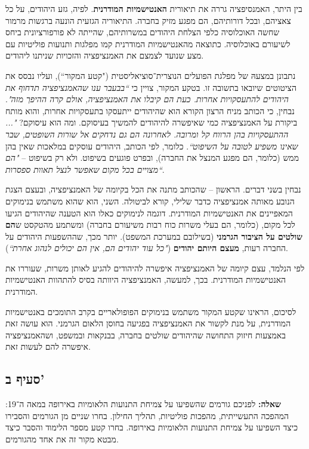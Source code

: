 \documentclass[]{article}
\newcommand\bs    {\blacksquare}
\begin{document}
		בין היתר, האמנסיפציה גררה את תיאורית \textbf{האנטישמיות המודרנית}. לפיה, גזע היהודים, על כל צאציהם, ובכל דורותיהם, הם מפגע מזיק בחברה. התיאוריה הגזעית הונעה ברגשות מרמור שחשה האוכלוסיה כלפי הצלחת היהודים במשרותיהם, שהייתה לא פורפורציונית ביחס לשיעורם באוכלוסיה. כתוצאה מהאנטישמיות המודרנית קמו מפלגות ותנועות פוליטיות עם מצע שנועד לצמצם את האמנציפציה והזכויות שניתנו ליהודים. 
		
		נתבונן במצעהּ של מפלגת הפועלים הנוצרית־סוציאליסטית ("קטע המקור``), ועליו נבסס את הציטוטים שיובאו בתשובה זו. בטקע המקור, צויין כי \textit{``בבעבר ענו שהאמנציפציה תדחוף את היהודים להתעסקויות אחרות. כעת הם קיבלו את האמנציפציה, אולם קרה ההיפך מזה"}. נבחין, כי הכותב מניח הרצון הקורא הוא שהיהודים ייתעסקו בתעסקויות אחרות, והוא מותח ביקורת על האמנציפציה כמי שאיפשרה להיהודים להמשיך בעיסוקם. ומה הוא עיסוקם? \textit{"... ההתעסקויות בהן הרווח קל ומרובה. לאחרונה הם גם נדחקים אל שורות השופטים, שבר שאינו משפיע לטובה על השיפוט``}. כלומר, לפי הכותב, היהודים עוסקים במלאכות שאין בהן ממש (כלומר, הם מפגע המנצל את החברה), ובפרט פוגעים בשיפוט. ולא רק בשיפוט – \textit{"הם מצויים בכל מקום שאפשר לנצל תאוות ספסרות``}. 
		
		נבחין בשני דברים. הראשון – שהכותב מתנה את הכל בקיומה של האמנציפציה, ובעצם הצגת הנובע מאותה אמנציפציה כדבר שלילי, קורא לביטולה. השני, הוא שהוא משתמש בנימוקים המאפיינים את האנטישמיות המודרנית. דוגמה לנימוקים כאלו הוא הטענה שהיהודים הגיעו לכל מקום, (כלומר, הם בעלי משרות כוח רבות משיעורם בחברה) ומשתמע מהטקסט ש\textbf{הם שולטים על הציבור הגרמני} (בשילובם במערכת המשפט). יותר מכך, שההשפעות היהודים על החברה רעות, \textbf{מעצם היותם יהודים} (\textit{"כל עוד יהודים הם, אין הם יכולים לנהוג אחרת``}).
		
		לפי הנלמד, עצם קיומה של האמנציפציה איפשרה להיהודים להגיע לאותן משרות, שעוררו את האנטישמיות המודרנית. בכך, למעשה, האמנציפציה היוותה בסיס להתהוות האנטישמיות המודרנית. 
		
		לסיכום, הראינו שקטע המקור משתמש בנימוקים הפופולאריים בקרב התומכים באנטישמיות המודרנית, על מנת לקשור את האמנציפציה בפגיעה בחוסן הלאום הגרמני. הוא עושה זאת באמצעות חיזוק התחושה שהיהודים שולטים בחברה, בבנקאות ובמשפט, ושהאמנציפציה איפשרה להם לעשות זאת. \hfill \bs
		
	\subsection*{סעיף ב'}
		\textbf{שאלה: }לפניכם גורמים שהשפיעו על צמיחת התנועות הלאומיות באירופה במאה ה־19: המהפכה התעשייתית, מהפכות פוליטיות, תהליך החילון. בחרו שניים מן הגורמים והסבירו כיצד השפיעו על צמיחת התנועות הלאומיות באירופה. בחרו קטע מספר הלימוד והסבר כיצד מבטא מקור זה את אחד מהגורמים. 
		
\end{document}
